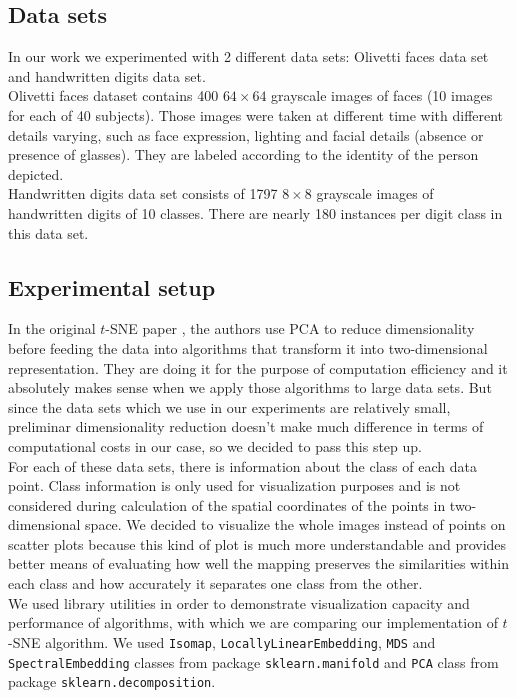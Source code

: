 \subsection{Data sets}

In our work we experimented with 2 different data sets: Olivetti faces data set and handwritten digits data set.\\ 

Olivetti faces dataset contains 400 $64 \times 64$ grayscale images of faces (10 images for each of 40 subjects). Those images were taken at different time with different details varying, such as face expression, lighting and facial details (absence or presence of glasses). They are labeled according to the identity of the person depicted.\\

Handwritten digits data set consists of 1797 $8 \times 8$ grayscale images of handwritten digits of 10 classes. There are nearly 180 instances per digit class in this data set.

\subsection{Experimental setup}

In the original $t$-SNE paper \cite{tsnearticle}, the authors use PCA to reduce dimensionality before feeding the data into algorithms that transform it into two-dimensional representation. They are doing it for the purpose of computation efficiency and it absolutely makes sense when we apply those algorithms to large data sets. But since the data sets which we use in our experiments are relatively small, preliminar dimensionality reduction doesn't make much difference in terms of computational costs in our case, so we decided to pass this step up.\\

For each of these data sets, there is information about the class of each data point. Class information is only used for visualization purposes and is not considered during calculation of the spatial coordinates of the points in two-dimensional space. We decided to visualize the whole images instead of points on scatter plots because this kind of plot is much more understandable and provides better means of evaluating how well the mapping preserves the similarities within each class and how accurately it separates one class from the other.\\

We used library utilities in order to demonstrate visualization capacity and performance of algorithms, with which we are comparing our implementation of $t$-SNE algorithm. We used \texttt{Isomap}, \texttt{LocallyLinearEmbedding}, \texttt{MDS} and \texttt{SpectralEmbedding} classes from package \texttt{sklearn.manifold} and \texttt{PCA} class from package \texttt{sklearn.decomposition}.\\


